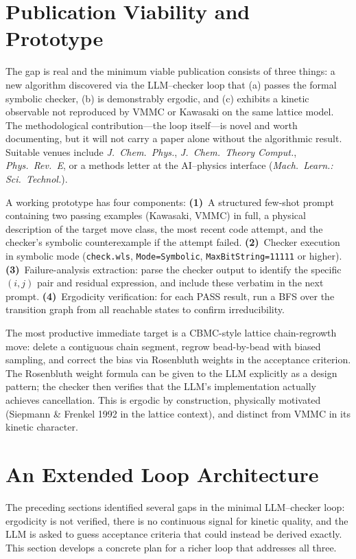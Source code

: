 \documentclass[10.5pt]{article}
\begin{document}
\section{Publication Viability and Prototype}

The gap is real and the minimum viable publication consists of three things:
a new algorithm discovered via the LLM--checker loop that (a) passes the formal
symbolic checker, (b) is demonstrably ergodic, and (c) exhibits a kinetic
observable not reproduced by VMMC or Kawasaki on the same lattice model.  The
methodological contribution---the loop itself---is novel and worth documenting,
but it will not carry a paper alone without the algorithmic result.  Suitable
venues include \textit{J.\ Chem.\ Phys.}, \textit{J.\ Chem.\ Theory Comput.},
\textit{Phys.\ Rev.\ E}, or a methods letter at the AI--physics interface
(\textit{Mach.\ Learn.: Sci.\ Technol.}).

A working prototype has four components: \textbf{(1)}~A structured few-shot
prompt containing two passing examples (Kawasaki, VMMC) in full, a physical
description of the target move class, the most recent code attempt, and the
checker's symbolic counterexample if the attempt failed.  \textbf{(2)}~Checker
execution in symbolic mode (\texttt{check.wls}, \texttt{Mode=Symbolic},
\texttt{MaxBitString=11111} or higher).  \textbf{(3)}~Failure-analysis
extraction: parse the checker output to identify the specific $(i,j)$ pair and
residual expression, and include these verbatim in the next prompt.
\textbf{(4)}~Ergodicity verification: for each PASS result, run a BFS over the
transition graph from all reachable states to confirm irreducibility.

The most productive immediate target is a CBMC-style lattice chain-regrowth
move: delete a contiguous chain segment, regrow bead-by-bead with biased
sampling, and correct the bias via Rosenbluth weights in the acceptance
criterion.  The Rosenbluth weight formula can be given to the LLM explicitly as
a design pattern; the checker then verifies that the LLM's implementation
actually achieves cancellation.  This is ergodic by construction, physically
motivated (Siepmann \& Frenkel 1992 in the lattice context), and distinct from
VMMC in its kinetic character.

\section{An Extended Loop Architecture}

The preceding sections identified several gaps in the minimal
LLM--checker loop: ergodicity is not verified, there is no continuous
signal for kinetic quality, and the LLM is asked to guess acceptance
criteria that could instead be derived exactly.  This section develops
a concrete plan for a richer loop that addresses all three.
\end{document}
